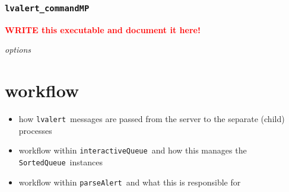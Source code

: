 \documentclass{article}
\newcommand{\FIXME}[1]{\textcolor{red}{\textbf{#1}}}
\newcommand{\alert}{\texttt{lvalert}~}
\newcommand{\lvalertCommandMP}{\texttt{lvalert\_commandMP}~}
\newcommand{\interactiveQueue}{\texttt{interactiveQueue}~}
\newcommand{\parseAlert}{\texttt{parseAlert}~}
\newcommand{\SortedQueue}{\texttt{SortedQueue}~}
\begin{document}

\subsubsection{\lvalertCommandMP}
\label{sec: lvalertCommandMP}

\FIXME{WRITE this executable and document it here!}

\vspace{0.5cm}
\noindent
\textit{options}


\section{workflow}
\label{sec: workflow}

\begin{itemize}
    \item{how \alert messages are passed from the server to the separate (child) processes}
    \item{workflow within \interactiveQueue and how this manages the \SortedQueue instances}
    \item{workflow within \parseAlert and what this is responsible for}
\end{itemize}
\end{document}
